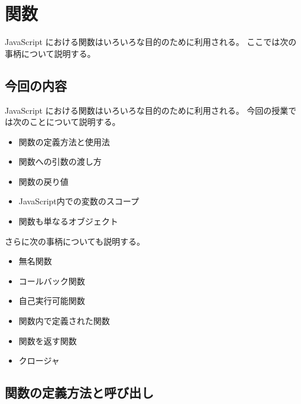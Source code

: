 \chapter{関数}
\ifText
JavaScript における関数はいろいろな目的のために利用される。
ここでは次の事柄について説明する。
\else
\section{今回の内容}
JavaScript における関数はいろいろな目的のために利用される。
今回の授業では次のことについて説明する。
\fi
\begin{itemize}
 \item 関数の定義方法と使用法
 \item 関数への引数の渡し方
 \item 関数の戻り値
 \item JavaScript内での変数のスコープ
 \item 関数も単なるオブジェクト
\end{itemize}
さらに次の事柄についても説明する。
\begin{itemize}
 \item 無名関数
 \item コールバック関数
 \item 自己実行可能関数
 \item 関数内で定義された関数
 \item 関数を返す関数
 \item クロージャ
\end{itemize}
\section{関数の定義方法と呼び出し}
